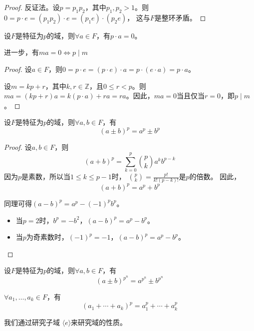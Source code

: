 \begin{proof}
    反证法。设\(p=p_{1}p_{2}\)，其中\(p_1,p_2>1\)。则\(0=p \cdot e=(p_{1}p_{2}) \cdot
    e=(p_{1}e) \cdot (p_{2}e)\)，
    这与\(F\)是整环矛盾。
\end{proof}

\begin{theorem}[]
    设\(F\)是特征为\(p\)的域，则\(\forall a \in F\)，有\(p \cdot a = 0\)。

    进一步，有\(ma=0 \iff p \mid m\)
\end{theorem}

\begin{proof}
    设\(a\in F\)，则\(0=p \cdot e=(p \cdot e) \cdot a=p \cdot (e \cdot
    a)=p \cdot a\)。

    设\(m=kp+r\)，其中\(k,r\in \mathbb{Z}\)，且\(0 \leq r < p\)。则
    \(ma=(kp+r)a=k(p \cdot a)+ra=ra\)。因此，\(ma=0\)当且仅当\(r=0\)，即\(p \mid m\)。
\end{proof}

\begin{theorem}[]
    设\(F\)是特征为\(p\)的域，则\(\forall a,b \in F\)，有\[
        (a\pm b)^{p}=a^{p}\pm b^{p}
    \]
\end{theorem}

\begin{proof}
    设\(a,b \in F\)，则\[
        (a+b)^{p}=\sum_{k=0}^{p}\binom{p}{k} a^{k} b^{p-k}
    \]
    因为\(p\)是素数，所以当\(1 \leq k \leq p-1\)时，
    \(\binom{p}{k}=\frac{p!}{k!(p-k)!}\)是\(p\)的倍数。
    因此，\[
        (a+b)^{p}=a^{p}+b^{p}
    \]

    同理可得\((a-b)^{p}=a^{p}-(-1)^{p}b^{p}\)。
    \begin{itemize}
        \item 当\(p=2\)时，\(b^{p}= - b^{2} \)，\((a-b)^{p}=a^{p}-b^{p}\)。
        \item 当\(p\)为奇素数时，\((-1)^{p}=-1\)，\((a-b)^{p}=a^{p}-b^{p}\)。
    \end{itemize}
\end{proof}
\begin{corollary}
    设\(F\)是特征为\(p\)的域，则\(\forall a ,b \in F\)，有\[
        (a\pm b)^{p^{n}}=a^{p^{n}}\pm b^{p^{n}}
    \]

    \(\forall a_{1},\dots ,a_{k} \in F\)，有\[
        (a_{1}+\cdots +a_{k})^{p}=a_{1}^{p}+\cdots +a_{k}^{p}
    \]
\end{corollary}

我们通过研究子域 \(\langle e \rangle\)来研究域的性质。

